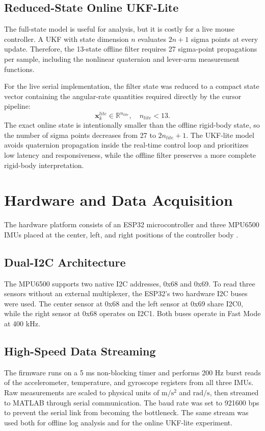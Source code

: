 \documentclass[conference]{IEEEtran}
\begin{document}
\subsection{Reduced-State Online UKF-Lite}
The full-state model is useful for analysis, but it is costly for a live mouse controller. A UKF with state dimension $n$ evaluates $2n+1$ sigma points at every update. Therefore, the 13-state offline filter requires 27 sigma-point propagations per sample, including the nonlinear quaternion and lever-arm measurement functions.

For the live serial implementation, the filter state was reduced to a compact state vector containing the angular-rate quantities required directly by the cursor pipeline:
\begin{equation}
\mathbf{x}^{lite}_k \in \mathbb{R}^{n_{lite}},
\quad n_{lite} < 13.
\end{equation}
The exact online state is intentionally smaller than the offline rigid-body state, so the number of sigma points decreases from 27 to $2n_{lite}+1$. The UKF-lite model avoids quaternion propagation inside the real-time control loop and prioritizes low latency and responsiveness, while the offline filter preserves a more complete rigid-body interpretation.

\section{Hardware and Data Acquisition}
The hardware platform consists of an ESP32 microcontroller and three MPU6500 IMUs placed at the center, left, and right positions of the controller body \cite{invensense2014}.

\subsection{Dual-I2C Architecture}
The MPU6500 supports two native I2C addresses, 0x68 and 0x69. To read three sensors without an external multiplexer, the ESP32's two hardware I2C buses were used. The center sensor at 0x68 and the left sensor at 0x69 share I2C0, while the right sensor at 0x68 operates on I2C1. Both buses operate in Fast Mode at 400 kHz.

\subsection{High-Speed Data Streaming}
The firmware runs on a 5 ms non-blocking timer and performs 200 Hz burst reads of the accelerometer, temperature, and gyroscope registers from all three IMUs. Raw measurements are scaled to physical units of $\mathrm{m/s^2}$ and $\mathrm{rad/s}$, then streamed to MATLAB through serial communication. The baud rate was set to 921600 bps to prevent the serial link from becoming the bottleneck. The same stream was used both for offline log analysis and for the online UKF-lite experiment.
\end{document}
